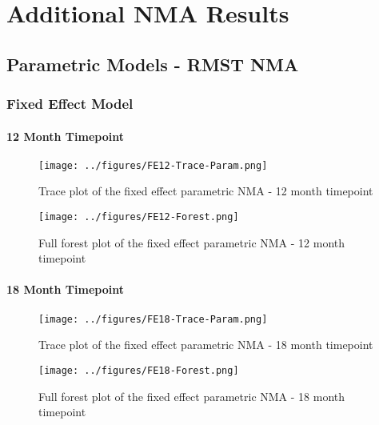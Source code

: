 \chapter{Additional NMA Results}\label{nmaappend}

\section{Parametric Models - RMST NMA}

\subsection{Fixed Effect Model}

\subsubsection{12 Month Timepoint}

\begin{figure}[h]
    \center
    \texttt{[image: ../figures/FE12-Trace-Param.png]}
    \caption{Trace plot of the fixed effect parametric NMA - 12 month timepoint}
    \label{fig:fe12_trace_param}
\end{figure}

\begin{figure}[h]
    \center
    \texttt{[image: ../figures/FE12-Forest.png]}
    \caption{Full forest plot of the fixed effect parametric NMA - 12 month timepoint}
    \label{fig:fe12_full_forest}
\end{figure}

\subsubsection{18 Month Timepoint}

\begin{figure}[h]
    \center
    \texttt{[image: ../figures/FE18-Trace-Param.png]}
    \caption{Trace plot of the fixed effect parametric NMA - 18 month timepoint}
    \label{fig:fe18_trace_param}
\end{figure}

\begin{figure}[h]
    \center
    \texttt{[image: ../figures/FE18-Forest.png]}
    \caption{Full forest plot of the fixed effect parametric NMA - 18 month timepoint}
    \label{fig:fe18_full_forest}
\end{figure}

